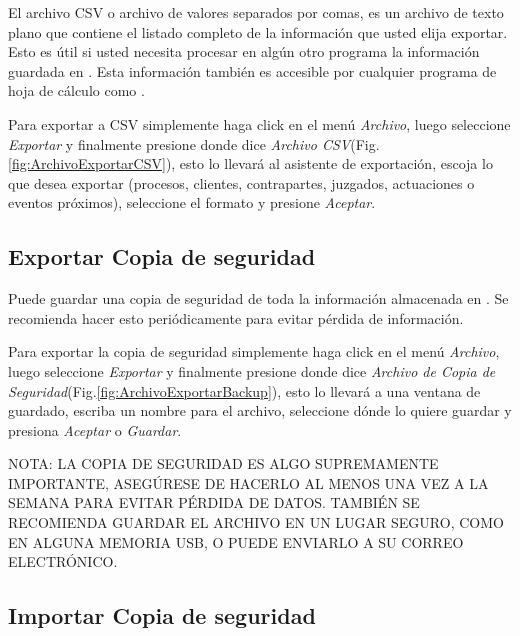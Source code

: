 El archivo CSV o archivo de valores separados por comas, es un archivo de texto plano que contiene el listado completo de la informaci\'on que usted elija exportar. Esto es \'util si usted necesita procesar en alg\'un otro programa la informaci\'on guardada en \softwareAbogadosDesktop. Esta informaci\'on tambi\'en es accesible por cualquier programa de hoja de c\'alculo como \microsoft \excel.

Para exportar a CSV simplemente haga click en el men\'u \emph{Archivo}, luego seleccione \emph{Exportar} y finalmente presione donde dice \emph{Archivo CSV}(Fig.\ref{fig:ArchivoExportarCSV}), esto lo llevar\'a al asistente de exportaci\'on, escoja lo que desea exportar (procesos, clientes, contrapartes, juzgados, actuaciones o eventos pr\'oximos), seleccione el formato y presione \emph{Aceptar}.
   

\subsection{Exportar Copia de seguridad}
\label{sec:exportarBackup}
Puede guardar una copia de seguridad de toda la informaci\'on almacenada en \softwareAbogadosDesktop. Se recomienda hacer esto peri\'odicamente para evitar p\'erdida de informaci\'on. 

Para exportar la copia de seguridad simplemente haga click en el men\'u \emph{Archivo}, luego seleccione \emph{Exportar} y finalmente presione donde dice \emph{Archivo de Copia de Seguridad}(Fig.\ref{fig:ArchivoExportarBackup}), esto lo llevar\'a a una ventana de guardado, escriba un nombre para el archivo, seleccione d\'onde lo quiere guardar y presiona \emph{Aceptar} o \emph{Guardar}.


NOTA: LA COPIA DE SEGURIDAD ES ALGO SUPREMAMENTE IMPORTANTE, ASEG\'URESE DE HACERLO AL MENOS UNA VEZ A LA SEMANA PARA EVITAR P\'ERDIDA DE DATOS. TAMBI\'EN SE RECOMIENDA GUARDAR EL ARCHIVO EN UN LUGAR SEGURO, COMO EN ALGUNA MEMORIA USB, O PUEDE ENVIARLO A SU CORREO ELECTR\'ONICO.

\subsection{Importar Copia de seguridad}

